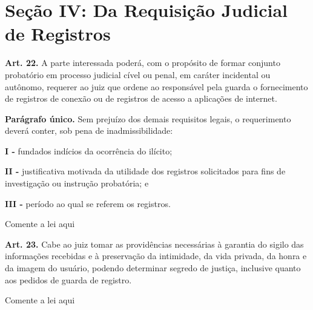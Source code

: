 \section{Seção IV: Da Requisição Judicial de Registros}


\noindent\textbf{Art. 22.} A parte interessada poderá, com o propósito de formar conjunto probatório em processo judicial cível ou penal, em caráter incidental ou autônomo, requerer ao juiz que ordene ao responsável pela guarda o fornecimento de registros de conexão ou de registros de acesso a aplicações de internet.

\noindent\textbf{Parágrafo único.}  Sem prejuízo dos demais requisitos legais, o requerimento deverá conter, sob pena de inadmissibilidade:

\noindent\textbf{I -} fundados indícios da ocorrência do ilícito;

\noindent\textbf{II -} justificativa motivada da utilidade dos registros solicitados para fins de investigação ou instrução probatória; e

\noindent\textbf{III -} período ao qual se referem os registros.

\begin{displayquote}
Comente a lei aqui  
\end{displayquote}  


\noindent\textbf{Art. 23.} Cabe ao juiz tomar as providências necessárias à garantia do sigilo das informações recebidas e à preservação da intimidade, da vida privada, da honra e da imagem do usuário, podendo determinar segredo de justiça, inclusive quanto aos pedidos de guarda de registro.

\begin{displayquote}
Comente a lei aqui  
\end{displayquote}